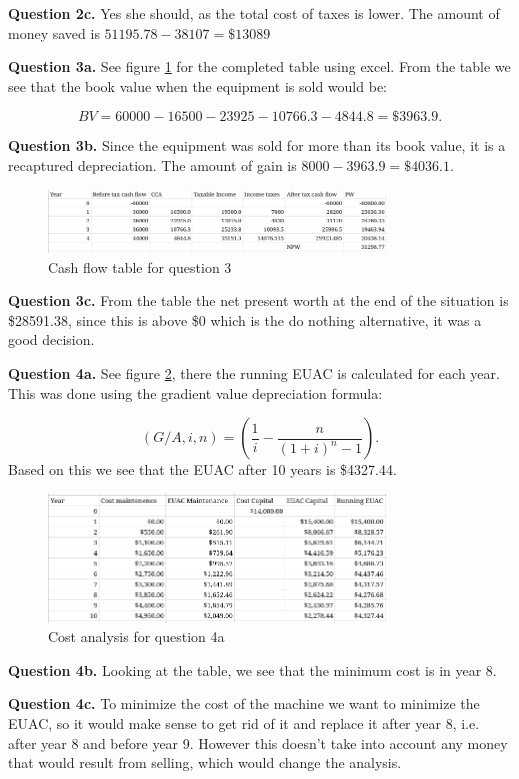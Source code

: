 \documentclass[letterpaper, reqno,11pt]{article}
\begin{document}
{\noindent\bf Question 2c.} Yes she should, as the total cost of taxes is lower. The amount of money saved is $51195.78-38107=\$13089$

{\noindent\bf Question 3a.} See figure \ref{fig:q3} for the completed table using excel. From the table we see that the book value when the equipment is sold would be: 

\[
BV=60000-16500-23925-10766.3-4844.8=\$3963.9
.\]

{\noindent\bf Question 3b.} Since the equipment was sold for more than its book value, it is a recaptured depreciation. The amount of gain is $8000-3963.9=\$4036.1$. 

\begin{figure}[htpb]
    \centering
    \includegraphics[width=0.8\textwidth]{q3}
    \caption{Cash flow table for question 3}
    \label{fig:q3}
\end{figure}

{\noindent\bf Question 3c.} From the table the net present worth at the end of the situation is \$28591.38, since this is above \$0 which is the do nothing alternative, it was a good decision. 

{\noindent\bf Question 4a.} See figure \ref{fig:q4}, there the running EUAC is calculated for each year. This was done using the gradient value depreciation formula: 

\[
    (G/A, i, n)=\left( \frac{1}{i}-\frac{n}{(1+i)^{n}-1} \right) 
.\]
Based on this we see that the EUAC after 10 years is \$4327.44. 

\begin{figure}[htpb]
    \centering
    \includegraphics[width=0.8\textwidth]{q4}
    \caption{Cost analysis for question 4a}
    \label{fig:q4}
\end{figure}

{\noindent\bf Question 4b.} Looking at the table, we see that the minimum cost is in year 8. 

{\noindent\bf Question 4c.} To minimize the cost of the machine we want to minimize the EUAC, so it would make sense to get rid of it and replace it after year 8, i.e. after year 8 and before year 9. However this doesn't take into account any money that would result from selling, which would change the analysis. 
\end{document}
